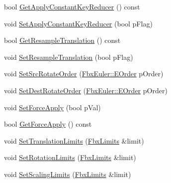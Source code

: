 \begin{DoxyCompactItemize}
\item 
bool \hyperlink{class_fbx_anim_curve_filter_matrix_converter_a01b2d31ebe1cc32373d01c7b3f3e7797}{Get\+Apply\+Constant\+Key\+Reducer} () const
\item 
void \hyperlink{class_fbx_anim_curve_filter_matrix_converter_a67f6df28fee3f4703d96a2f92d58dfe2}{Set\+Apply\+Constant\+Key\+Reducer} (bool p\+Flag)
\item 
bool \hyperlink{class_fbx_anim_curve_filter_matrix_converter_a7603a34315c35f2d9ba8f501059992c5}{Get\+Resample\+Translation} () const
\item 
void \hyperlink{class_fbx_anim_curve_filter_matrix_converter_a3ce7c2108f6a39ad4a13cbc4175a5ec8}{Set\+Resample\+Translation} (bool p\+Flag)
\item 
void \hyperlink{class_fbx_anim_curve_filter_matrix_converter_a7140e4dce0bf5ef87d75991fa5eb315e}{Set\+Src\+Rotate\+Order} (\hyperlink{class_fbx_euler_a7d5bec7eedb022b4dae56894ab7a9939}{Fbx\+Euler\+::\+E\+Order} p\+Order)
\item 
void \hyperlink{class_fbx_anim_curve_filter_matrix_converter_a115f94c96f1f14b55e4f3f9b6bc5977a}{Set\+Dest\+Rotate\+Order} (\hyperlink{class_fbx_euler_a7d5bec7eedb022b4dae56894ab7a9939}{Fbx\+Euler\+::\+E\+Order} p\+Order)
\item 
void \hyperlink{class_fbx_anim_curve_filter_matrix_converter_a4b49dc7704c847a3b909cf7d9052f7a7}{Set\+Force\+Apply} (bool p\+Val)
\item 
bool \hyperlink{class_fbx_anim_curve_filter_matrix_converter_abeb4273e3155dd4644a35a68f39ebda3}{Get\+Force\+Apply} () const
\item 
void \hyperlink{class_fbx_anim_curve_filter_matrix_converter_a892ade0f0e5b7451a6e09da5ee4179bf}{Set\+Translation\+Limits} (\hyperlink{class_fbx_limits}{Fbx\+Limits} \&limit)
\item 
void \hyperlink{class_fbx_anim_curve_filter_matrix_converter_a95cad4a51f2204a7c5cce101486eaab6}{Set\+Rotation\+Limits} (\hyperlink{class_fbx_limits}{Fbx\+Limits} \&limit)
\item 
void \hyperlink{class_fbx_anim_curve_filter_matrix_converter_ad291cc58221b27ffa8824c73d00cc0ba}{Set\+Scaling\+Limits} (\hyperlink{class_fbx_limits}{Fbx\+Limits} \&limit)
\end{DoxyCompactItemize}
